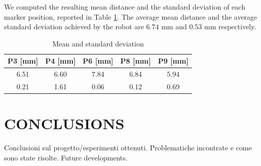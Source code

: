 \documentclass[letterpaper, 10 pt, conference]{ieeeconf}  %
\begin{document}
We computed the resulting mean distance and the standard deviation of each marker position, reported in Table \ref{tab:mean}. The average mean distance and the average standard deviation achieved by the robot are $6.74$ mm and $0.53$ mm respectively.

\begin{table}[h]
\begin{center}
\caption{Mean and standard deviation}
\label{tab:mean}
\begin{tabular}{|c||c||c||c||c|}
\hline
\textbf{P3 [mm]} & \textbf{P4 [mm]} & \textbf{P6 [mm]} & \textbf{P8 [mm]} & \textbf{P9 [mm]} \\
\hline
6.51 & 6.60 & 7.84 & 6.84 & 5.94\\
0.21 & 1.61 & 0.06 & 0.12 & 0.69\\
\hline
\end{tabular}
\end{center}
\end{table}

\section{CONCLUSIONS}

Conclusioni sul progetto/esperimenti ottenuti.
Problematiche incontrate e come sono state risolte.
Future developments.

\addtolength{\textheight}{-12cm}   %



\end{document}
